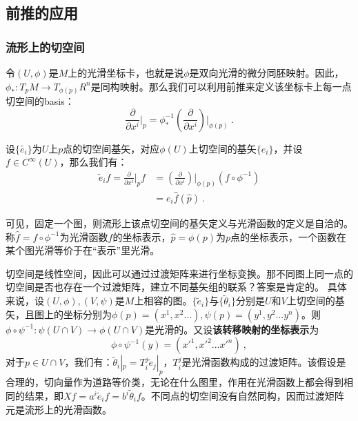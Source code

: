 \subsection{前推的应用}
\subsubsection{流形上的切空间}
令$(U,\phi)$是$M$上的光滑坐标卡，也就是说$\phi$是双向光滑的微分同胚映射。因此，$\phi_*:T_p M\rightarrow T_{\phi(p)}R^n$是同构映射。那么我们可以利用前推来定义该坐标卡上每一点切空间的basis：
\begin{equation}
\frac{\partial}{\partial x^i}\bigg|_p=\phi^{-1}_* (\frac{\partial}{\partial x^i})\bigg|_{\phi(p)}~.
\end{equation}

设$\{\widetilde{e_i}\}$为$U$上$p$点的切空间基矢，对应$\phi (U)$上切空间的基矢$\{{e_i}\}$，并设$f\in C^{\infty}(U)$，那么我们有：
\begin{equation}
\begin{aligned}
\widetilde e_i f=\frac{\partial}{\partial x^i}\bigg|_p f&= (\frac{\partial}{\partial x^i})\bigg|_{\phi(p)}(f\circ \phi^{-1})\\
&=e_i\hat f(\hat p)~.
\end{aligned}
\end{equation}

可见，固定一个图，则流形上该点切空间的基矢定义与光滑函数的定义是自洽的。称$\hat f=f\circ \phi^{-1}$为光滑函数$f$的坐标表示，$\hat p=\phi (p)$为$p$点的坐标表示，一个函数在某个图光滑等价于在“表示”里光滑。

切空间是线性空间，因此可以通过过渡矩阵来进行坐标变换。那不同图上同一点的切空间是否也存在一个过渡矩阵，建立不同基矢组的联系？答案是肯定的。
具体来说，设$(U,\phi),(V,\psi)$是$M$上相容的图。$\{\widetilde e_i\}$与$\{\widetilde \theta_i\}$分别是$U$和$V$上切空间的基矢，且图上的坐标分别为$\phi(p)=(x^1,x^2...),\psi(p)=(y^1,y^2...y^n)$。则$\phi\circ\psi^{-1}:\psi(U\cap V)\rightarrow\phi(U\cap V)$是光滑的。又设\textbf{该转移映射的坐标表示}为
\begin{equation}
\phi\circ \psi^{-1}(y)=(x'^1,x'^2...x'^n)~,
\end{equation}
对于$p\in U\cap V$，我们有：$\widetilde\theta_i|_p=T^j_i \widetilde e_j|_p$，$T^j_i$是光滑函数构成的过渡矩阵。该假设是合理的，切向量作为道路等价类，无论在什么图里，作用在光滑函数上都会得到相同的结果，即$Xf=a^i\widetilde e_if=b^i\widetilde \theta_i f$。不同点的切空间没有自然同构，因而过渡矩阵元是流形上的光滑函数。

